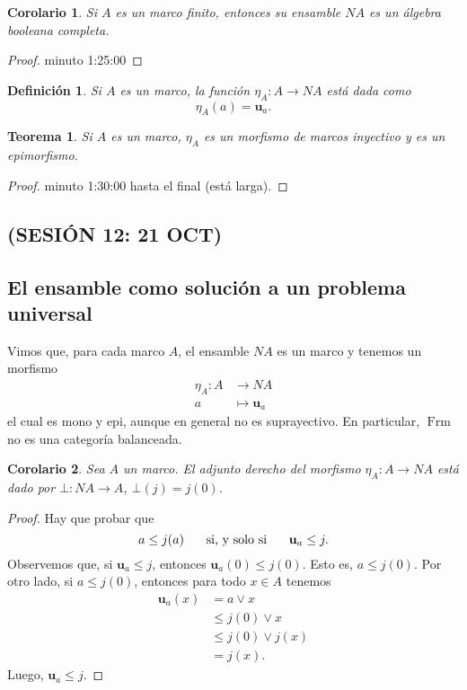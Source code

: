 \documentclass[12pt,letterpaper,titlepage]{article}
\newtheorem*{defn}{Definición}
\newtheorem*{cor}{Corolario}
\newtheorem*{thm}{Teorema}
\theoremstyle{definition}
\renewcommand\sup{\vee}
\newcommand\ssi{\hspace{5mm}\text{ si, y solo si }\hspace{5mm}}
\newcommand\unuc[1]{\mathbf u_{#1}}
\newcommand\<{\langle}
\renewcommand\>{\rangle}
\DeclareMathOperator{\Frm}{Frm}
\begin{document}
\begin{cor}
  Si $A$ es un marco finito, entonces su ensamble $NA$ es un
  álgebra booleana completa.
\end{cor}
\begin{proof}
  minuto 1:25:00
\end{proof}

\begin{defn}
  Si $A$ es un marco, la función $\eta_A:A\to NA$ está dada como
  \[
    \eta_A(a) = \unuc a
  .\]
\end{defn}

\begin{thm}
  Si $A$ es un marco, $\eta_A$ es un morfismo de marcos inyectivo
  y es un epimorfismo.
\end{thm}
\begin{proof}
  minuto 1:30:00 hasta el final (está larga).
\end{proof}

\subsection*{(SESIÓN 12: 21 OCT)}

\subsection{El ensamble como solución a un problema universal}

Vimos que, para cada marco $A$, el ensamble $NA$ es un marco y
tenemos un morfismo
\begin{align*}
  \eta_A: A&\to NA \\
  a &\mapsto \unuc a
\end{align*}
el cual es mono y epi, aunque en general no es suprayectivo.
En particular, $\Frm$ no es una categoría balanceada.

\begin{cor}
  Sea $A$ un marco.
  El adjunto derecho del morfismo $\eta_A:A\to NA$ está dado por
  $\bot:NA\to A$, $\bot(j)=j(0)$.
\end{cor}
\begin{proof}
  Hay que probar que
  \[
    a\leq j(a) \ssi \unuc a \leq j
  .\]
  Observemos que, si $\unuc a \leq j$, entonces
  $\unuc a(0) \leq j(0)$.
  Esto es, $a\leq j(0)$.
  Por otro lado, si $a\leq j(0)$, entonces para todo $x\in A$
  tenemos
  \begin{align*}
    \unuc a (x)
    &= a\sup x \\
    &\leq j(0) \sup x \\
    &\leq j(0) \sup j(x) \\
    &= j(x).
  \end{align*}
  Luego, $\unuc a \leq j$.
\end{proof}
\end{document}
